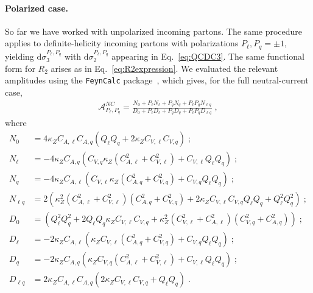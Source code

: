 \documentclass[a4paper,11pt]{article}
\begin{document}
\paragraph{Polarized case.}
So far we have worked with unpolarized incoming partons. The same procedure applies to definite-helicity incoming partons with polarizations $P_\ell, P_q=\pm 1$, yielding $\mathrm{d} \sigma_3^{P_\ell,P_q}$ with $\mathrm{d}\sigma_2^{P_\ell,P_q}$ appearing in Eq.~\eqref{eq:QCDC3}. The same functional form for $R_2$ arises as in Eq.~\eqref{eq:R2expression}. We evaluated the relevant amplitudes using the \texttt{FeynCalc} package~\cite{Mertig:1990an,Shtabovenko:2016sxi,Shtabovenko:2020gxv,Shtabovenko:2023idz}, which gives, for the full neutral-current case,
\begin{align}\label{eq:APol}
\mathcal{A}^{NC}_{P_\ell,P_q} = \frac{ N_0 + P_\ell N_\ell + P_q N_q + P_\ell P_q N_{\ell q}} {D_0 + P_\ell D_\ell + P_q D_q + P_\ell P_q D_{\ell q} }\;,
\end{align}
where
\begin{align}\label{eq:NDsA}
N_0 &= 4 \kappa_Z C_{A,\ell} C_{A,q} \left(Q_\ell Q_q+2\kappa_Z C_{V,\ell}C_{V,q} \right)\;;\\
N_\ell &= -4\kappa_Z C_{A,q}  (C_{V,q} \kappa_Z (C_{A,\ell}^2+C_{V,\ell}^2)+C_{V,\ell} Q_\ell Q_q)\;;\\
N_q &= -4\kappa_Z C_{A,\ell} (C_{V,\ell} \kappa_Z (C_{A,q}^2+C_{V,q}^2)+C_{V,q} Q_\ell Q_q)\;; \\
N_{\ell q} &= 2 \left(\kappa_Z^2 (C_{A,\ell}^2+C_{V,\ell}^2) (C_{A,q}^2+C_{V,q}^2)+2\kappa_Z C_{V,\ell} C_{V,q} Q_\ell Q_q  + Q_\ell^2 Q_q^2\right)\;;\\
D_0 &= \left(Q_\ell^2Q_q^2+2Q_\ell Q_q \kappa_Z C_{V,\ell}C_{V,q}
+\kappa_Z^2\left(C^2_{V,\ell}+C^2_{A,\ell}\right)\left(C^2_{V,q   }+C^2_{A,q   }\right)\right)\;; \\
D_\ell &= -2\kappa_Z C_{A,\ell} \left(\kappa_Z C_{V,\ell} (C_{A,q}^2+C_{V,q}^2)+C_{V,q} Q_\ell Q_q\right)\;; \\
D_q &= -2\kappa_Z C_{A,q} \left( \kappa_Z C_{V,q} (C_{A,\ell}^2+C_{V,\ell}^2)+C_{V,\ell} Q_\ell Q_q\right)\;;\\
D_{\ell q} &= 2\kappa_Z C_{A,\ell} C_{A,q} (2\kappa_Z C_{V,\ell} C_{V,q} + Q_\ell Q_q)\;.\label{eq:NDsAFinal}
\end{align}
\end{document}
